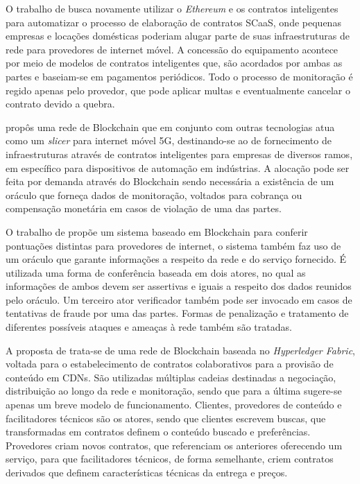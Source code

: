 %
O trabalho de  busca novamente utilizar o \textit{Ethereum} e os contratos inteligentes para automatizar o processo de elaboração de contratos \ac{SCaaS}, onde pequenas empresas e locações domésticas poderiam alugar parte de suas infraestruturas de rede para provedores de internet móvel. A concessão do equipamento acontece por meio de modelos de contratos inteligentes que, são acordados por ambas as partes e baseiam-se em pagamentos periódicos. Todo o processo de monitoração é regido apenas pelo provedor, que pode aplicar multas e eventualmente cancelar o contrato devido a quebra.

 propôs uma rede de Blockchain que em conjunto com outras tecnologias atua como um \textit{slicer} para internet móvel 5G, destinando-se ao de fornecimento de infraestruturas através de contratos inteligentes para empresas de diversos ramos, em específico para dispositivos de automação em indústrias. A alocação pode ser feita por demanda através do Blockchain sendo necessária a existência de um oráculo que forneça dados de monitoração, voltados para cobrança ou compensação monetária em casos de violação de uma das partes.

O trabalho de \cite{blockchain:blockchain_as} propõe um sistema baseado em Blockchain para conferir pontuações distintas para provedores de internet, o sistema também faz uso de um oráculo que garante informações a respeito da rede e do serviço fornecido. É utilizada uma forma de conferência baseada em dois atores, no qual as informações de ambos devem ser assertivas e iguais a respeito dos dados reunidos pelo oráculo. Um terceiro ator verificador também pode ser invocado em casos de tentativas de fraude por uma das partes. Formas de penalização e tratamento de diferentes possíveis ataques e ameaças à rede também são tratadas.

A proposta de  trata-se de uma rede de Blockchain baseada no \textit{Hyperledger Fabric}, voltada para o estabelecimento de contratos colaborativos para a provisão de conteúdo em \acp{CDN}. São utilizadas múltiplas cadeias destinadas a negociação, distribuição ao longo da rede e monitoração, sendo que para a última sugere-se apenas um breve modelo de funcionamento. Clientes, provedores de conteúdo e facilitadores técnicos são os atores, sendo que clientes escrevem buscas, que transformadas em contratos definem o conteúdo buscado e preferências. Provedores criam novos contratos, que referenciam os anteriores oferecendo um serviço, para que facilitadores técnicos, de forma semelhante, criem contratos derivados que definem características técnicas da entrega e preços.

